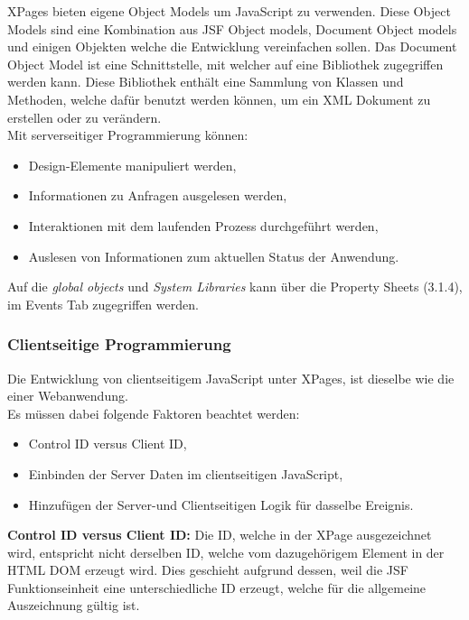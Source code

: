 XPages bieten eigene Object Models um JavaScript zu verwenden. Diese Object Models sind eine Kombination aus JSF Object models, Document Object
models und einigen Objekten \linebreak welche die Entwicklung vereinfachen sollen. Das Document Object Model ist eine Schnittstelle, mit welcher auf eine
Bibliothek zugegriffen werden kann.
Diese Bibliothek enthält eine \linebreak Sammlung von Klassen und Methoden, welche dafür benutzt werden können, um ein XML Dokument zu erstellen oder zu
verändern\cite{donelly}.\\
\newline
Mit serverseitiger Programmierung können:
\begin{itemize}
\item Design-Elemente manipuliert werden,
\item Informationen zu Anfragen ausgelesen werden,
\item Interaktionen mit dem laufenden Prozess durchgeführt werden,
\item Auslesen von Informationen zum aktuellen Status der Anwendung.
\end{itemize}

Auf die \textit{global objects} und \textit{System Libraries} kann über die Property Sheets (3.1.4), im Events Tab zugegriffen werden. 


\subsubsection{Clientseitige Programmierung}
\label{javascript}

Die Entwicklung von clientseitigem JavaScript unter XPages, ist dieselbe wie die einer \linebreak Webanwendung.\\
\newline
Es müssen dabei folgende Faktoren beachtet werden:
\begin{itemize}
\item Control ID versus Client ID,
\item Einbinden der Server Daten im clientseitigen JavaScript,
\item Hinzufügen der Server-und Clientseitigen Logik für dasselbe Ereignis.
\end{itemize}
\vspace{0.5cm}


\textbf{Control ID versus Client ID: } Die ID, welche in der XPage ausgezeichnet wird, entspricht nicht derselben ID, welche vom dazugehörigem Element
in der HTML DOM erzeugt wird. Dies geschieht aufgrund dessen, weil die JSF Funktionseinheit eine unterschiedliche ID erzeugt, welche für die allgemeine
Auszeichnung gültig ist. \newline
\newline


